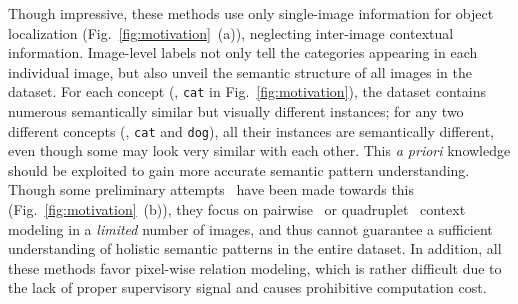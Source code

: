 \documentclass[10pt,twocolumn,letterpaper]{article}
\begin{document}
Though impressive, these methods use only single-image information for object localization (Fig.~\ref{fig:motivation}~(a)), neglecting inter-image contextual information. Image-level labels not only tell the categories appearing in each individual image, but also  unveil the semantic structure  of all images in the dataset. For each concept (\ie, \texttt{cat} in Fig.~\ref{fig:motivation}), the dataset contains numerous semantically similar but visually different instances; for any two different concepts (\eg, \texttt{cat} and \texttt{dog}), all their instances are semantically different, even though some may look very similar with each other. This \textit{a priori} knowledge should be exploited to gain more accurate semantic pattern understanding.
Though some preliminary attempts~\cite{fan2020cian,zhang2020inter,sun2020mining,zhou2021group} have been made towards this (Fig.~\ref{fig:motivation}~(b)), they focus on  pairwise~\cite{fan2020cian,zhang2020inter,sun2020mining} or quadruplet~\cite{zhou2021group} context modeling in a \textit{limited} number of images, and thus cannot guarantee a sufficient understanding of holistic semantic patterns in the entire dataset. In addition, all these methods favor pixel-wise relation modeling, which is rather difficult due to the lack of proper supervisory signal and causes prohibitive computation cost.
\end{document}
